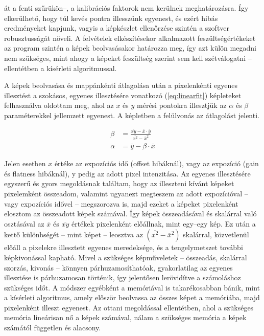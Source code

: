 \documentclass[a4paper,12pt]{article}
\begin{document}
át a fenti szűrükön--, a kalibrációs  faktorok nem kerülnek meghatározásra. Így elkerülhető, hogy túl kevés pontra illesszünk egyenest, és ezért hibás eredményeket kapjunk, vagyis a képkészlet ellenőrzése szintén a szoftver robusztusságát növeli. A felvételek elkészítésekor alkalmazott feszültségértékeket az program szintén a képek beolvasásakor határozza meg, így azt külön megadni nem szükséges, mint ahogy a képeket feszültség szerint sem kell szétválogatni -- ellentétben a kísérleti algoritmussal.

A képek beolvasása és mappánkénti  átlagolása után a pixelenkénti egyenes illesztést a szokásos, egyenes illesztésére vonatkozó (\ref{eq:linearfit}) képleteket felhasználva oldottam meg, ahol az $x$ és $y$ mérési pontokra illesztjük az $\alpha$ és $\beta$ paraméterekkel jellemzett egyenest.  A képletben a felülvonás az átlagolást jelenti.

\begin{equation}
\label{eq:linearfit}
\begin{split}
\beta &= \frac{ \overline{xy} - \overline x \cdot \overline y }{\overline{x^2} - {\overline{x}}^2}\\
\alpha &= \overline y -\beta \cdot \overline x
\end{split}
\end{equation}


Jelen esetben $x$ értéke az expozíciós idő (offset hibáknál), vagy az expozíció (gain és flatness hibáknál), y pedig az adott pixel intenzitása. Az egyenes illesztésére egyszerű és gyors megoldásnak találtam, hogy az illeszteni kívánt képeket pixelemként összeadom, valamint ugyanezt megteszem az adott expozícióval -- vagy expozíciós idővel -- megszorozva is, majd ezeket a képeket pixelenként elosztom az összeadott képek számával. Így képek összeadásával és skalárral való osztásával az $\overline x$ és $\overline{xy}$ értékek pixelenként előállnak, mint egy--egy kép. Ez után a kettő különbségét -- mint képet -- leosztva az  $\left ( \overline{x^2} - {\overline{x}}^2\right )$ skalárral, közvetlenül előáll a pixelekre illesztett egyenes meredeksége, és a tengelymetszet további képkivonással kapható. Mivel a szükséges képműveletek -- összeadás, skalárral szorzás, kivonás -- könnyen párhuzamosíthatóak, gyakorlatilag az egyenes illesztése is párhuzamosan történik, így jelentősen lerövidítve a számoláshoz szükséges időt. 
 A módszer egyébként a memóriával is takarékosabban bánik, mint a kísérleti algoritmus, amely először beolvassa az összes képet a memóriába, majd pixelenként illeszt egyenest. Az ottani megoldással ellentétben, ahol a szükséges memória lineárisan nő a képek számával, nálam a szükséges memória a képek számától független és alacsony.
\end{document}
